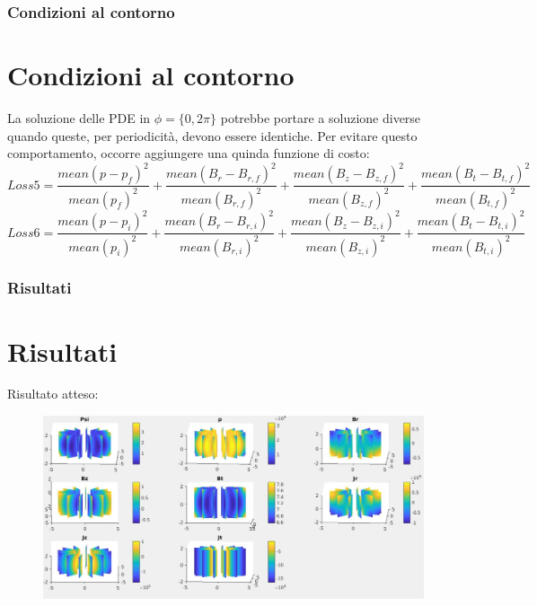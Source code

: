 \documentclass{beamer}
\begin{document}
\begin{frame}
	\frametitle{Condizioni al contorno}
	\section{Condizioni al contorno}
	La soluzione delle PDE in \(\phi = \{ 0,2\pi \} \) potrebbe portare a soluzione diverse quando queste, per periodicità, devono essere identiche. Per evitare questo comportamento, occorre aggiungere una quinda funzione di costo:\begin{equation*}
		Loss5 = \frac{mean{(p-p_{f})}^{2}}{mean{(p_{f})}^{2}}+\frac{mean{(B_{r}-B_{r,f})}^{2}}{mean{(B_{r,f})}^{2}}+\frac{mean{(B_{z}-B_{z,f})}^{2}}{mean{(B_{z,f})}^{2}}+\frac{mean{(B_{t}-B_{t,f})}^{2}}{mean{(B_{t,f})}^{2}}
	\end{equation*}
	\begin{equation*}
		Loss6 = \frac{mean{(p-p_{i})}^{2}}{mean{(p_{i})}^{2}}+\frac{mean{(B_{r}-B_{r,i})}^{2}}{mean{(B_{r,i})}^{2}}+\frac{mean{(B_{z}-B_{z,i})}^{2}}{mean{(B_{z,i})}^{2}}+\frac{mean{(B_{t}-B_{t,i})}^{2}}{mean{(B_{t,i})}^{2}}
	\end{equation*}
\end{frame}
\begin{frame}
	\frametitle{Risultati}
	\section{Risultati}
		Risultato atteso:
		\begin{figure}
			\includegraphics[scale=0.3]{2022-06-20-23-05-27.png}%
		\end{figure}
\end{frame}
\end{document}
